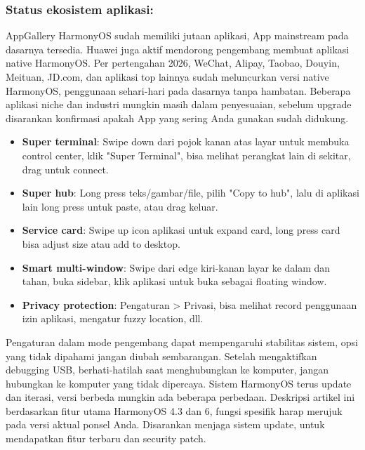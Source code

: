 \subsubsection*{Status ekosistem aplikasi:}

AppGallery HarmonyOS sudah memiliki jutaan aplikasi, App mainstream pada dasarnya tersedia. Huawei juga aktif mendorong pengembang membuat aplikasi native HarmonyOS. Per pertengahan 2026, WeChat, Alipay, Taobao, Douyin, Meituan, JD.com, dan aplikasi top lainnya sudah meluncurkan versi native HarmonyOS, penggunaan sehari-hari pada dasarnya tanpa hambatan. Beberapa aplikasi niche dan industri mungkin masih dalam penyesuaian, sebelum upgrade disarankan konfirmasi apakah App yang sering Anda gunakan sudah didukung.


\begin{itemize}
  \item \textbf{Super terminal}: Swipe down dari pojok kanan atas layar untuk membuka control center, klik "Super Terminal", bisa melihat perangkat lain di sekitar, drag untuk connect.
  \item \textbf{Super hub}: Long press teks/gambar/file, pilih "Copy to hub", lalu di aplikasi lain long press untuk paste, atau drag keluar.
  \item \textbf{Service card}: Swipe up icon aplikasi untuk expand card, long press card bisa adjust size atau add to desktop.
  \item \textbf{Smart multi-window}: Swipe dari edge kiri-kanan layar ke dalam dan tahan, buka sidebar, klik aplikasi untuk buka sebagai floating window.
  \item \textbf{Privacy protection}: Pengaturan > Privasi, bisa melihat record penggunaan izin aplikasi, mengatur fuzzy location, dll.
\end{itemize}

\begin{tcbwarn}{Pengaturan dalam mode pengembang dapat mempengaruhi stabilitas sistem, opsi yang tidak dipahami jangan diubah sembarangan. Setelah mengaktifkan debugging USB, berhati-hatilah saat menghubungkan ke komputer, jangan hubungkan ke komputer yang tidak dipercaya.}
Sistem HarmonyOS terus update dan iterasi, versi berbeda mungkin ada beberapa perbedaan. Deskripsi artikel ini berdasarkan fitur utama HarmonyOS 4.3 dan 6, fungsi spesifik harap merujuk pada versi aktual ponsel Anda. Disarankan menjaga sistem update, untuk mendapatkan fitur terbaru dan security patch.

\end{tcbwarn}

